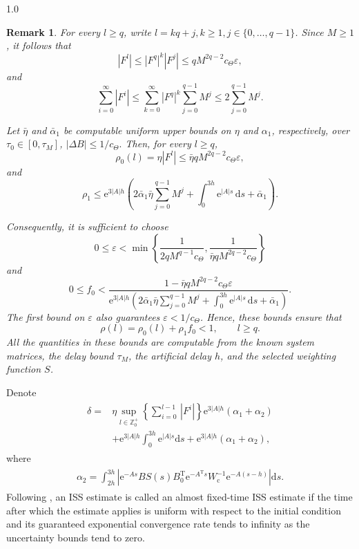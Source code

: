 \documentclass[journal]{IEEEtran}
\newtheorem{remark}{Remark}
\begin{document}
\begin{spacing}{1.0}
\begin{remark}
For every $l\geq q$, write
$l=kq+j,
k\geq1,
j\in\{0,\ldots,q-1\}$.
Since $M\geq1$, it follows that
\[
|F^{l}|
\leq
|F^{q}|^{k}|F^{j}|
\leq
qM^{2q-2}
c_{\mathit{\Theta}}
\varepsilon,
\]
and
\[
\sum_{i=0}^{\infty}|F^{i}|
\leq
\sum_{k=0}^{\infty}|F^{q}|^{k}
\sum_{j=0}^{q-1}M^{j}
\leq
2\sum_{j=0}^{q-1}M^{j}.
\]

Let $\bar{\eta}$ and $\bar{\alpha}_{1}$ be computable uniform
upper bounds on $\eta$ and $\alpha_{1}$, respectively, over
$\tau_{0}\in[0,\tau_{M}]$, $|\mathit{\Delta}B|
\leq
1/c_{\mathit{\Theta}}.
$
Then, for every $l\geq q$,
\[
\rho_{0}(l)
=
\eta|F^{l}|
\leq
\bar{\eta}
qM^{2q-2}
c_{\mathit{\Theta}}
\varepsilon,
\]
and
\[
\rho_{1}
\leq
\mathrm{e}^{3|A|h}
\left(
2\bar{\alpha}_{1}\bar{\eta}
\sum_{j=0}^{q-1}M^{j}
+
\int_{0}^{3h}
\mathrm{e}^{|A|s}\,\mathrm{d}s
+
\bar{\alpha}_{1}
\right).
\]

Consequently, it is sufficient to choose
\[
0\leq\varepsilon
<
\min
\left\{
\frac{1}{
2qM^{q-1}c_{\mathit{\Theta}}
},
\frac{1}{
\bar{\eta}qM^{2q-2}c_{\mathit{\Theta}}
}
\right\}
\]
and
\[
0\leq f_{0}
<
\frac{
1-
\bar{\eta}qM^{2q-2}
c_{\mathit{\Theta}}
\varepsilon
}{
\mathrm{e}^{3|A|h}
\left(
2\bar{\alpha}_{1}\bar{\eta}
\displaystyle\sum_{j=0}^{q-1}M^{j}
+
\displaystyle\int_{0}^{3h}
\mathrm{e}^{|A|s}\,\mathrm{d}s
+
\bar{\alpha}_{1}
\right)
}.
\]
The first bound on $\varepsilon$ also guarantees
$\varepsilon<1/c_{\mathit{\Theta}}$. Hence, these bounds ensure that
\[
\rho(l)
=
\rho_{0}(l)+\rho_{1}f_{0}
<1,
\qquad
l\geq q.
\]
All the quantities in these bounds are computable from the known
system matrices, the delay bound $\tau_{M}$, the artificial delay
$h$, and the selected weighting function $S$.
\end{remark}


Denote%
\begin{align}\label{delta_c}
\begin{array}{ll}
	\delta=  &  \eta\sup_{l\in%
\mathbb{Z}
_{0}^{+}}\left\{  \sum_{i=0}^{l-1}\,\left\vert F^{i}\right\vert \right\}
\mathrm{e}^{3\left\vert A\right\vert h}\left(  \alpha_{1}+\alpha_{2}\right)\\
&  +\mathrm{e}^{3\left\vert A\right\vert h}\int_{0}^{3h}\mathrm{e}^{\left\vert
A\right\vert s}\mathrm{d}s+\mathrm{e}^{3\left\vert A\right\vert h}\left(
\alpha_{1}+\alpha_{2}\right)  , %
\end{array}
\end{align}
where%
\begin{align}\label{alpha_02}
\begin{array}{ll}
\alpha_{2}=\int_{2h}^{3h}\left\vert \mathrm{e}^{-As}BS(s)B_{0}^{\mathrm{T}}\mathrm{e}^{-A^{\mathrm{T}}s}W_{\mathrm{c}%
}^{-1}\mathrm{e}^{-A(s-h)}\right\vert \mathrm{d}s. %
\end{array}
\end{align}
Following \cite{Mazenc25tac}, an ISS estimate is called an almost fixed-time
ISS estimate if the time after which the estimate applies is uniform with
respect to the initial condition and its guaranteed exponential convergence
rate tends to infinity as the uncertainty bounds tend to zero.


\end{spacing}
\end{document}
